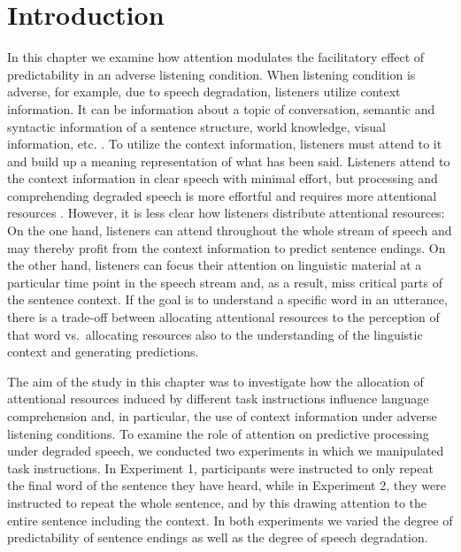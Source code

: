 \documentclass[a4paper, nobind]{templates/ociamthesis}
\begin{document}
\hypertarget{introduction}{%
\section{Introduction}\label{introduction}}

In this chapter we examine how attention modulates the facilitatory effect of predictability in an adverse listening condition.
When listening condition is adverse, for example, due to speech degradation, listeners utilize context information.
It can be information about a topic of conversation, semantic and syntactic information of a sentence structure, world knowledge, visual information, etc. \autocites{Kaiser2004,Knoeferle2005,Altmann2007,Xiang2015}[for reviews,][]{Stilp2020}.
To utilize the context information, listeners must attend to it and build up a meaning representation of what has been said.
Listeners attend to the context information in clear speech with minimal effort, but processing and comprehending degraded speech is more effortful and requires more attentional resources \autocite{Eckert2016,Peelle2018,Wild2012}.
However, it is less clear how listeners distribute attentional resources:
On the one hand, listeners can attend throughout the whole stream of speech and may thereby profit from the context information to predict sentence endings.
On the other hand, listeners can focus their attention on linguistic material at a particular time point in the speech stream and, as a result, miss critical parts of the sentence context.
If the goal is to understand a specific word in an utterance, there is a trade-off between allocating attentional resources to the perception of that word vs.~allocating resources also to the understanding of the linguistic context and generating predictions.

The aim of the study in this chapter was to investigate how the allocation of attentional resources induced by different task instructions influence language comprehension and, in particular, the use of context information under adverse listening conditions.
To examine the role of attention on predictive processing under degraded speech, we conducted two experiments in which we manipulated task instructions.
In Experiment 1, participants were instructed to only repeat the final word of the sentence they have heard,
while in Experiment 2, they were instructed to repeat the whole sentence, and by this drawing attention to the entire sentence including the context.
In both experiments we varied the degree of predictability of sentence endings as well as the degree of speech degradation.
\end{document}

